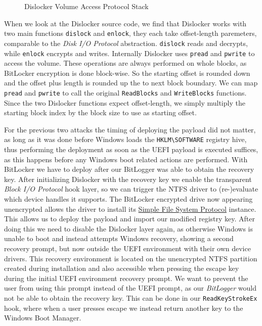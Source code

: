 \begin{figure}[htb]%
    \centering
    
    \caption{Dislocker Volume Access Protocol Stack}%
    \label{fig:dislocker-volume-access-protocol-stack}%
\end{figure}

When we look at the Dislocker source code, we find that Dislocker works with two main functions \lstinline{dislock} and \lstinline{enlock}, they each take offset-length paremeters, comparable to the \emph{Disk \ac{I/O} Protocol} abstraction.
\lstinline{dislock} reads and decrypts, while \lstinline{enlock} encrypts and writes.
Internally Dislocker uses \lstinline{pread} and \lstinline{pwrite} to access the volume.
These operations are always performed on whole blocks, as BitLocker encryption is done block-wise.
So the starting offset is rounded down and the offset plus length is rounded up the to next block boundary.
We can map \lstinline{pread} and \lstinline{pwrite} to call the original \lstinline{ReadBlocks} and \lstinline{WriteBlocks} functions.
Since the two Dislocker functions expect offset-length, we simply multiply the starting block index by the block size to use as starting offset.


For the previous two attacks the timing of deploying the payload did not matter, as long as it was done before Windows loads the \lstinline{HKLM\SOFTWARE} registry hive, thus performing the deployment as soon as the \ac{UEFI} payload is executed suffices, as this happens before any Windows boot related actions are performed.
With BitLocker we have to deploy after our BitLogger was able to obtain the recovery key.
After initializing Dislocker with the recovery key we enable the transparent \emph{Block \ac{I/O} Protocol} hook layer, so we can trigger the \ac{NTFS} driver to (re-)evaluate which device handles it supports.
The BitLocker encrypted drive now appearing unencrypted allows the driver to install its \hyperref[lst:simple-file-system-protocol]{Simple File System Protocol} instance.
This allows us to deploy the payload and import our modified registry key.
After doing this we need to disable the Dislocker layer again, as otherwise Windows is unable to boot and instead attempts Windows recovery, showing a second recovery prompt, but now outside the \ac{UEFI} environment with their own device drivers.
This recovery environment is located on the unencrypted \ac{NTFS} partition created during installation and also accessible when pressing the escape key during the initial \ac{UEFI} environment recovery prompt.
We want to prevent the user from using this prompt instead of the \ac{UEFI} prompt, as our \emph{BitLogger} would not be able to obtain the recovery key.
This can be done in our \lstinline{ReadKeyStrokeEx} hook, where when a user presses escape we instead return another key to the Windows Boot Manager.

